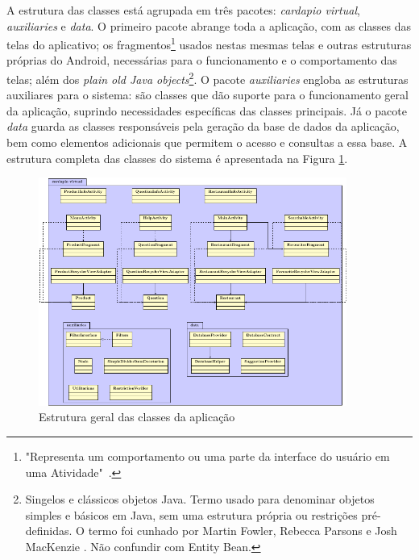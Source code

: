 A estrutura das classes está agrupada em três pacotes: \emph{cardapio virtual}, \emph{auxiliaries} e \emph{data}. O primeiro pacote abrange toda a aplicação, com as classes das telas do aplicativo; os fragmentos\footnote{"Representa um comportamento ou uma parte da interface do usuário em uma Atividade"\ \cite{DEV-FRAGMENTOS}.} usados nestas mesmas telas e outras estruturas próprias do Android, necessárias para o funcionamento e o comportamento das telas; além dos \emph{plain old Java objects}\footnote{Singelos e clássicos objetos Java. Termo usado para denominar objetos simples e básicos em Java, sem uma estrutura própria ou restrições pré-definidas. O termo foi cunhado por Martin Fowler, Rebecca Parsons e Josh MacKenzie \cite{POJO2000}. Não confundir com Entity Bean.}. O pacote \emph{auxiliaries} engloba as estruturas auxiliares para o sistema: são classes que dão suporte para o funcionamento geral da aplicação, suprindo necessidades específicas das classes principais. Já o pacote \emph{data} guarda as classes responsáveis pela geração da base de dados da aplicação, bem como elementos adicionais que permitem o acesso e consultas a essa base. A estrutura completa das classes do sistema é apresentada na Figura \ref{fig:diagrama-classes}.

\begin{figure}[H]
	\centering
	\caption[Estrutura de Classes]{\label{fig:diagrama-classes}Estrutura geral das classes  da aplicação}
	\includegraphics[width=0.9\textwidth]{./pdf/tikz/diagrama-classes.pdf}
\end{figure}
